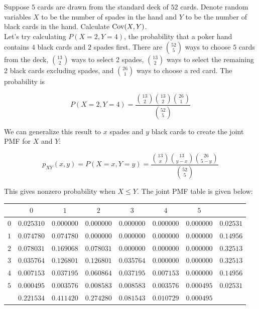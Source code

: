 \begin{texample}
	Suppose $5$ cards are drawn from the standard deck of $52$ cards. Denote random variables $X$ to be the number of spades in the hand and $Y$ to be the number of black cards in the hand. Calculate $\operatorname{Cov}(X,Y)$. \\
	
	Let's try calculating $P(X=2,Y=4)$, the probability that a poker hand contains $4$ black cards and $2$ spades first. There are ${52 \choose 5}$ ways to choose $5$ cards from the deck, ${13\choose2}$ ways to select 2 spades, ${13\choose2}$ ways to select the remaining 2 black cards excluding spades, and ${26\choose1}$ ways to choose a red card. The probability is
	
	\[ P(X=2,Y=4)=\frac{{13\choose2}{13\choose2}{26\choose1}}{{52\choose5}} \]
	
	We can generalize this result to $x$ spades and $y$ black cards to create the joint PMF for $X$ and $Y$:
	
	\[ p_{XY}(x,y)=P(X=x,Y=y)=\frac{{13\choose x}{13\choose y-x}{26\choose 5-y}}{{52\choose5}} \]
	
	This gives nonzero probability when $X\le Y$. The joint PMF table is given below:
	
	\begin{center}
		\footnotesize
		\begin{tabular}{|c|c|c|c|c|c|c|c|}
			\hline
			\diagbox{$Y$}{$X$} &         $0$&         $1$&         $2$&         $3$&         $4$&         $5$& \\
			\hline
			$0$ & $0.025310$ & $0.000000$ & $0.000000$ & $0.000000$ & $0.000000$ & $0.000000$ & $0.02531$ \\
			\hline
			$1$ & $0.074780$ & $0.074780$ & $0.000000$ & $0.000000$ & $0.000000$ & $0.000000$ & $0.14956$ \\
			\hline
			$2$ & $0.078031$ & $0.169068$ & $0.078031$ & $0.000000$ & $0.000000$ & $0.000000$ & $0.32513$ \\
			\hline
			$3$ & $0.035764$ & $0.126801$ & $0.126801$ & $0.035764$ & $0.000000$ & $0.000000$ & $0.32513$ \\
			\hline
			$4$ & $0.007153$ & $0.037195$ & $0.060864$ & $0.037195$ & $0.007153$ & $0.000000$ & $0.14956$ \\
			\hline
			$5$ & $0.000495$ & $0.003576$ & $0.008583$ & $0.008583$ & $0.003576$ & $0.000495$ & $0.02531$ \\
			\hline
			& $0.221534$ & $0.411420$ & $0.274280$ & $0.081543$ & $0.010729$ & $0.000495$ & \diagbox{$p_X$}{$p_Y$} \\
			\hline
		\end{tabular}
	\end{center}
	

\end{texample}
